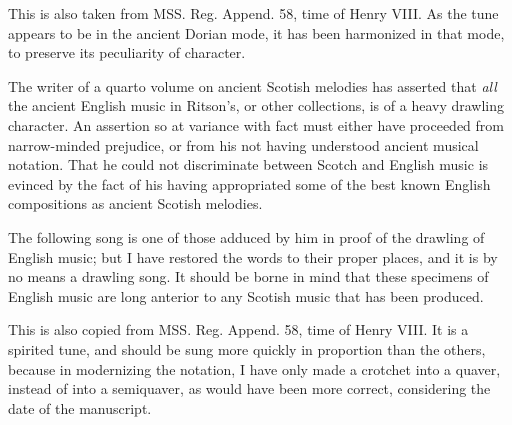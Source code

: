 This is also taken from MSS. Reg. Append. 58, time of Henry VIII. As the
tune appears to be in the ancient Dorian mode, it has been harmonized in that
mode, to preserve its peculiarity of character.

The writer of a quarto volume on ancient Scotish melodies has asserted that
\textit{all} the ancient English music in Ritson’s, or other collections, is of a heavy
drawling character. An assertion so at variance with fact must either have
proceeded from narrow-minded prejudice, or from his not having understood
ancient musical notation. That he could not discriminate between Scotch and
English music is evinced by the fact of his having appropriated some of the best
known English compositions as ancient Scotish melodies.
\pagebreak

The following song is one of those adduced by him in proof of the drawling of
English music; but I have restored the words to their proper places, and it is by
no means a drawling song. It should be borne in mind that these specimens of
English music are long anterior to any Scotish music that has been produced.

\medskip

\noindent\begin{minipage}{\textwidth}

\end{minipage}


This is also copied from MSS. Reg. Append. 58, time of Henry VIII. It is a
spirited tune, and should be sung more quickly in proportion than the others,
because in modernizing the notation, I have only made a crotchet into a quaver,
instead of into a semiquaver, as would have been more correct, considering the
date of the manuscript.

\noindent\begin{minipage}{\textwidth}
\vspace{\baselineskip}

\end{minipage}

\pagebreak

